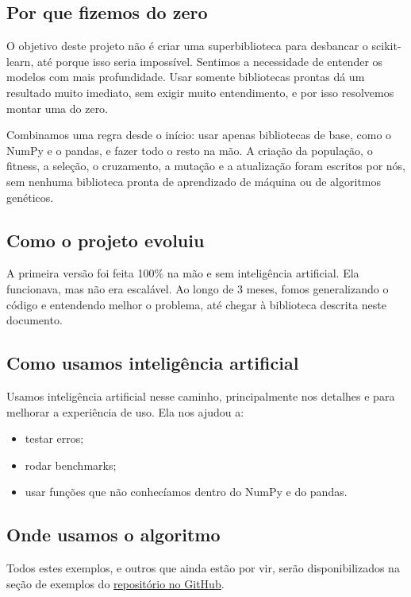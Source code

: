 \documentclass[11pt,a4paper]{article}
\begin{document}
\subsection{Por que fizemos do zero}

O objetivo deste projeto não é criar uma superbiblioteca para desbancar o scikit-learn, até porque isso seria impossível. Sentimos a necessidade de entender os modelos com mais profundidade. Usar somente bibliotecas prontas dá um resultado muito imediato, sem exigir muito entendimento, e por isso resolvemos montar uma do zero.

Combinamos uma regra desde o início: usar apenas bibliotecas de base, como o NumPy e o pandas, e fazer todo o resto na mão. A criação da população, o fitness, a seleção, o cruzamento, a mutação e a atualização foram escritos por nós, sem nenhuma biblioteca pronta de aprendizado de máquina ou de algoritmos genéticos.

\subsection{Como o projeto evoluiu}

A primeira versão foi feita 100\% na mão e sem inteligência artificial. Ela funcionava, mas não era escalável. Ao longo de 3 meses, fomos generalizando o código e entendendo melhor o problema, até chegar à biblioteca descrita neste documento.

\subsection{Como usamos inteligência artificial}

Usamos inteligência artificial nesse caminho, principalmente nos detalhes e para melhorar a experiência de uso. Ela nos ajudou a:

\begin{itemize}
  \item testar erros;
  \item rodar benchmarks;
  \item usar funções que não conhecíamos dentro do NumPy e do pandas.
\end{itemize}

\subsection{Onde usamos o algoritmo}

Todos estes exemplos, e outros que ainda estão por vir, serão disponibilizados na seção de exemplos do \href{https://github.com/FeAlmassy/AlgoritmoGenetico}{repositório no GitHub}.
\end{document}
